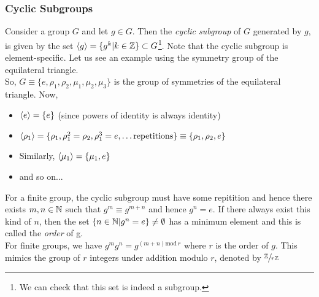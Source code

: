 \subsubsection{Cyclic Subgroups}
Consider a group $G$ and let $g\in G$. Then the \textit{cyclic subgroup} of $G$ generated by $g$, is given by the set $\left\langle g \right\rangle = \{g^k|k\in \mathbb{Z} \}\subset G$\footnote{We can check that this set is indeed a subgroup.}. Note that the cyclic subgroup is element-specific. Let us see an example using the symmetry group of the equilateral triangle.\\[0.2cm]
So, $G\equiv \{e,\rho_1, \rho_2, \mu_1, \mu_2, \mu_3\}$ is the group of symmetries of the equilateral triangle. Now,
\begin{itemize}
    \item $\left\langle e \right\rangle = \{e\}$ (since powers of identity is always identity)
    \item $\left\langle \rho_1 \right\rangle = \{\rho_1, \rho_1^2 = \rho_2, \rho_1^3 = e, \ldots \text{repetitions}\}\equiv \{\rho_1,\rho_2,e\}$ 
    \item Similarly, $\left\langle \mu_1 \right\rangle = \{\mu_1, e\}$
    \item and so on...
\end{itemize}
For a finite group, the cyclic subgroup must have some repitition and hence there exists $m,n\in \mathbb{N}$ such that $g^m \equiv g^{m+n}$ and hence $g^n = e$. If there always exist this kind of $n$, then the set $\{n\in \mathbb{N}|g^n=e\}\neq \emptyset$ has a minimum element and this is called the \textit{order} of g. \\[0.2cm]
For finite groups, we have $g^m g^n = g^{(m+n) \mathrm{mod} \ r}$ where $r$ is the order of $g$. This mimics the group of $r$ integers under addition modulo $r$, denoted by $\sfrac{\mathbb{Z}}{r\mathbb{Z}}$
